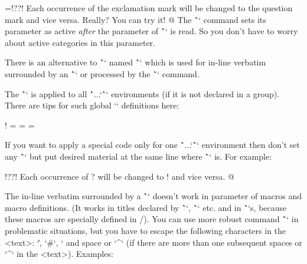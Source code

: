 \begtt \adef@{\string\endtt}
\everytt={\adef!{?}\adef?{!}}
\begtt
Each occurrence of the exclamation mark will be changed to
the question mark and vice versa. Really? You can try it!
@
\endtt
%
The \~`\adef` command sets its parameter as active {\it after\/}
the parameter of \^`\everytt` is read. So you don't have to worry about active
categories in this parameter.

There is an alternative to \^`\everytt` named \^`\everyintt` which is used for
in-line verbatim surrounded by an \^`\verbchar` or processed by the \~`\code`
command.

The \^`\everytt` is applied to all \^`\begtt...`\^`\endtt` environments (if it is not
declared in a group). There are tips for such global `\everytt` definitions here:

\begtt \adef!{ }
\everytt={\typosize[9/11]}  %
\everytt={}        %
\everytt={\visiblesp}       %
\endtt

\new
If you want to apply a special code only for one \^`\begtt...`\^`\endtt`
environment then don't set any \^`\everytt` but put desired material at the
same line where \^`\begtt` is. For example:

\begtt   \adef@{\string\endtt}
\begtt   \adef!{?}\adef?{!}
Each occurrence of ? will be changed to ! and vice versa.
@
\endtt

The in-line verbatim surrounded by a \^`\verbchar` doesn't work in
parameter of macros and macro definitions. (It works in titles declared by
\~`\chap`, \~`\sec` etc. and in \~`\fnote`s, because these macros are
specially defined in \OpTeX/).
\new
You can use more robust command \^`` in problematic
situations, but you have to escape the following characters in the <text>:
`\`, `#`, `%
and space or `^` (if there are more than one subsequent spaces or `^` in
the <text>). Examples:

